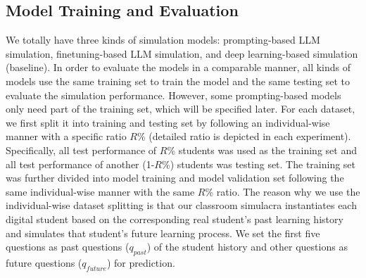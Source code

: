 \subsection{Model Training and Evaluation}
\label{subsec: traing testing split}
We totally have three kinds of simulation models: prompting-based LLM simulation, finetuning-based LLM simulation, and deep learning-based simulation (baseline).
In order to evaluate the models in a comparable manner, all kinds of models use the same training set to train the model and the same testing set to evaluate the simulation performance. However, some prompting-based models only need part of the training set, which will be specified later.
For each dataset, we first split it into training and testing set by following an individual-wise manner with a specific ratio $R$\% (detailed ratio is depicted in each experiment). Specifically, all test performance of $R$\% students was used as the training set and all test performance of another (1-$R$\%) students was testing set. The training set was further divided into model training and model validation set following the same individual-wise manner with the same $R$\% ratio. 
The reason why we use the individual-wise dataset splitting is that our classroom simulacra instantiates each digital student based on the corresponding real student's past learning history and simulates that student's future learning process. 
We set the first five questions as past questions ($q_{past}$) of the student history and other questions as future questions ($q_{future}$) for prediction.

